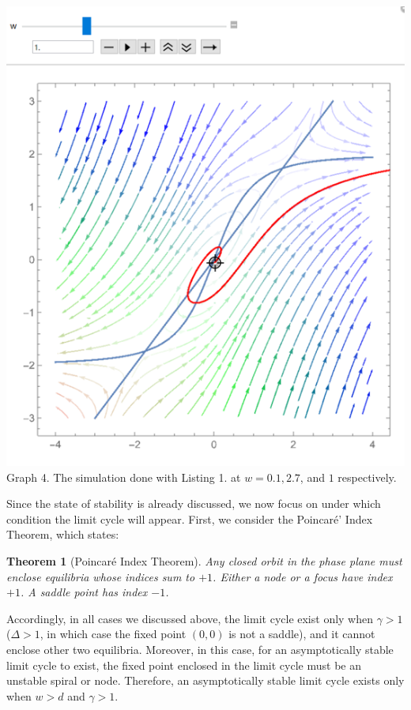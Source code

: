 \documentclass[12pt]{article}
\newtheorem*{theorem}{Theorem}
\begin{document}
\begin{center}
  \includegraphics[scale=0.3]{ StabilitySketch02.png}
\\
\footnotesize{Graph 4. The simulation done with Listing 1. at $w=0.1,2.7$, and $1$ respectively.}
\end{center}

Since the state of stability is already discussed, we now focus on under which condition the limit cycle will appear. First, we consider the Poincaré' Index Theorem, which states:
\begin{theorem}[Poincaré Index Theorem]
Any closed orbit in the phase plane must enclose equilibria whose indices sum to $+1$. Either a node or a focus have index $+1$. A saddle point has index $-1$.
\end{theorem}

Accordingly, in all cases we discussed above, the limit cycle exist only when $\gamma>1$ ($\Delta>1$, in which case the fixed point $(0,0)$ is not a saddle), and it cannot enclose other two equilibria. Moreover, in this case, for an asymptotically stable limit cycle to exist, the fixed point enclosed in the limit cycle must be an unstable spiral or node. Therefore, an asymptotically stable limit cycle exists only when $w>d$ and $\gamma>1$.
\end{document}
